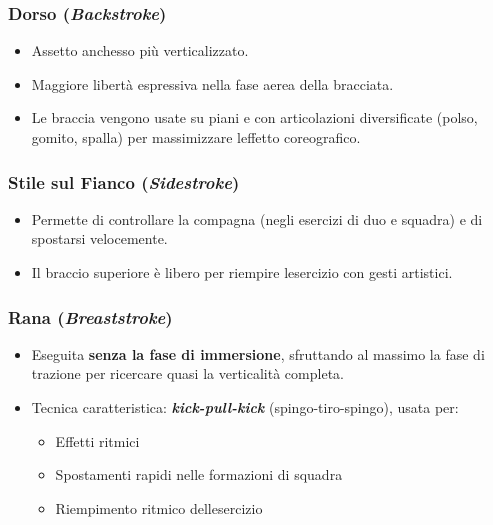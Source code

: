 \documentclass[a4paper,11pt]{article}
\providecommand{\tightlist}{%
  \setlength{\itemsep}{0pt}\setlength{\parskip}{0pt}}
\begin{document}
\subsubsection{\texorpdfstring{Dorso
            (\emph{Backstroke})}{Dorso (Backstroke)}}\label{dorso-backstroke-1}

\begin{itemize}
      \tightlist
      \item
            Assetto anch\textquotesingle esso più verticalizzato.
      \item
            Maggiore libertà espressiva nella fase aerea della bracciata.
      \item
            Le braccia vengono usate su piani e con articolazioni diversificate
            (polso, gomito, spalla) per massimizzare l\textquotesingle effetto
            coreografico.
\end{itemize}

\subsubsection{\texorpdfstring{Stile sul Fianco
            (\emph{Sidestroke})}{Stile sul Fianco (Sidestroke)}}\label{stile-sul-fianco-sidestroke}

\begin{itemize}
      \tightlist
      \item
            Permette di controllare la compagna (negli esercizi di duo e squadra)
            e di spostarsi velocemente.
      \item
            Il braccio superiore è libero per riempire l\textquotesingle esercizio
            con gesti artistici.
\end{itemize}

\subsubsection{\texorpdfstring{Rana
            (\emph{Breaststroke})}{Rana (Breaststroke)}}\label{rana-breaststroke-1}

\begin{itemize}
      \tightlist
      \item
            Eseguita \textbf{senza la fase di immersione}, sfruttando al massimo
            la fase di trazione per ricercare quasi la verticalità completa.
      \item
            Tecnica caratteristica: \textbf{\emph{kick-pull-kick}}
            (spingo-tiro-spingo), usata per:

            \begin{itemize}
                  \tightlist
                  \item
                        Effetti ritmici
                  \item
                        Spostamenti rapidi nelle formazioni di squadra
                  \item
                        Riempimento ritmico dell\textquotesingle esercizio
            \end{itemize}
\end{itemize}
\end{document}
